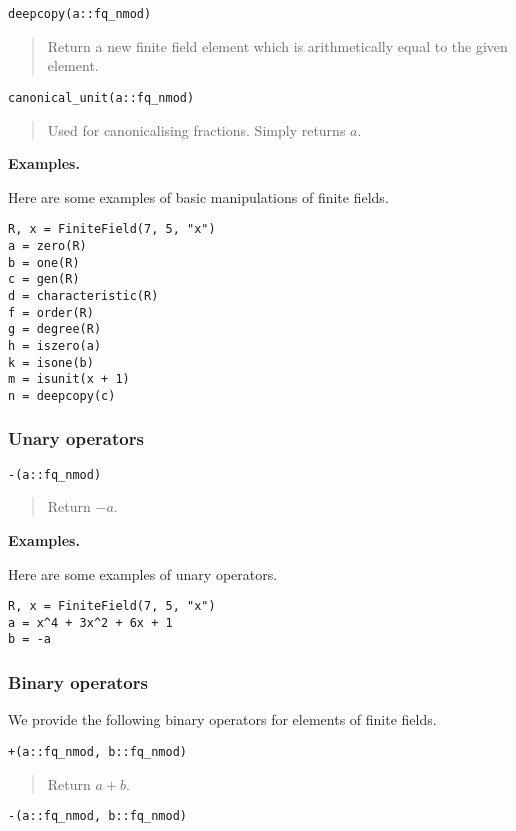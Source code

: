 \documentclass[a4paper,10pt]{article}
\newcommand{\desc}[1]{\vspace{-3mm}\begin{quote}#1\end{quote}}
\begin{document}
{{\begin{lstlisting}
deepcopy(a::fq_nmod)
\end{lstlisting}

\desc{Return a new finite field element which is arithmetically equal to
the given element.}

\begin{lstlisting}
canonical_unit(a::fq_nmod)
\end{lstlisting}

\desc{Used for canonicalising fractions. Simply returns $a$.}

\textbf{Examples.}

Here are some examples of basic manipulations of finite fields.

\begin{lstlisting}
R, x = FiniteField(7, 5, "x")
a = zero(R)
b = one(R)
c = gen(R)
d = characteristic(R)
f = order(R)
g = degree(R)
h = iszero(a)
k = isone(b)
m = isunit(x + 1)
n = deepcopy(c)
\end{lstlisting}

\subsubsection{Unary operators}

\begin{lstlisting}
-(a::fq_nmod)
\end{lstlisting}

\desc{Return $-a$.}

\textbf{Examples.}

Here are some examples of unary operators.

\begin{lstlisting}
R, x = FiniteField(7, 5, "x")
a = x^4 + 3x^2 + 6x + 1
b = -a
\end{lstlisting}

\subsubsection{Binary operators}

We provide the following binary operators for elements of
finite fields.

\begin{lstlisting}
+(a::fq_nmod, b::fq_nmod)
\end{lstlisting}

\desc{Return $a + b$.}

\begin{lstlisting}
-(a::fq_nmod, b::fq_nmod)
\end{lstlisting}

}}
\end{document}
